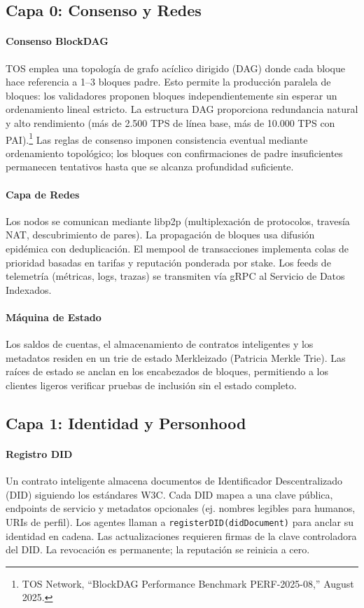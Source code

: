 \documentclass[11pt]{article}
\begin{document}
\subsection{Capa 0: Consenso y Redes}
\paragraph{Consenso BlockDAG} TOS emplea una topología de grafo acíclico dirigido (DAG) donde cada bloque hace referencia a 1--3 bloques padre. Esto permite la producción paralela de bloques: los validadores proponen bloques independientemente sin esperar un ordenamiento lineal estricto. La estructura DAG proporciona redundancia natural y alto rendimiento (más de 2.500 TPS de línea base, más de 10.000 TPS con PAI).\footnote{TOS Network, ``BlockDAG Performance Benchmark PERF-2025-08,'' August 2025.} Las reglas de consenso imponen consistencia eventual mediante ordenamiento topológico; los bloques con confirmaciones de padre insuficientes permanecen tentativos hasta que se alcanza profundidad suficiente.

\paragraph{Capa de Redes} Los nodos se comunican mediante libp2p (multiplexación de protocolos, travesía NAT, descubrimiento de pares). La propagación de bloques usa difusión epidémica con deduplicación. El mempool de transacciones implementa colas de prioridad basadas en tarifas y reputación ponderada por stake. Los feeds de telemetría (métricas, logs, trazas) se transmiten vía gRPC al Servicio de Datos Indexados.

\paragraph{Máquina de Estado} Los saldos de cuentas, el almacenamiento de contratos inteligentes y los metadatos residen en un trie de estado Merkleizado (Patricia Merkle Trie). Las raíces de estado se anclan en los encabezados de bloques, permitiendo a los clientes ligeros verificar pruebas de inclusión sin el estado completo.

\subsection{Capa 1: Identidad y Personhood}
\paragraph{Registro DID} Un contrato inteligente almacena documentos de Identificador Descentralizado (DID) siguiendo los estándares W3C. Cada DID mapea a una clave pública, endpoints de servicio y metadatos opcionales (ej. nombres legibles para humanos, URIs de perfil). Los agentes llaman a \texttt{registerDID(didDocument)} para anclar su identidad en cadena. Las actualizaciones requieren firmas de la clave controladora del DID. La revocación es permanente; la reputación se reinicia a cero.
\end{document}
